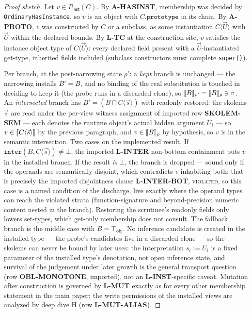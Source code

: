 \documentclass[11pt]{article}
\begin{document}
\begin{proof}[Proof sketch]
Let $v \in P_{\mathsf{inst}}(C)$. By \textbf{A-HASINST}, membership was
decided by \texttt{OrdinaryHasInstance}, so $v$ is an object with
$C.\texttt{prototype}$ in its chain. By \textbf{A-PROTO}, $v$ was
constructed by $C$ or a subclass, as some instantiation
$C\langle \vec U \rangle$ with $\vec U$ within the declared bounds. By
\textbf{L-TC} at the construction site, $v$ satisfies the instance
object type of $C\langle \vec U \rangle$: every declared field present
with a $\vec U$-instantiated get-type, inherited fields included
(subclass constructors must complete \texttt{super()}).

Per branch, at the post-narrowing state $\rho'$: a \emph{kept} branch
is unchanged — the narrowing installs $B' = B$, and no binding of the
real substitution is touched in deciding to keep it (the probe runs in
a discarded clone), so $\llbracket B \rrbracket_{\rho'} = \llbracket B \rrbracket_{\rho} \ni v$. An
\emph{intersected} branch has
$B' = (B \sqcap C\langle \vec s \rangle)$ with readonly restored: the
skolems $\vec s$ are read under the per-view witness assignment of
imported row \textbf{SKOLEM-SEM} — each denotes the runtime object's
actual hidden argument $U_i$ — so
$v \in \llbracket C\langle \vec s \rangle \rrbracket$ by the previous paragraph, and
$v \in \llbracket B \rrbracket_{\rho}$ by hypothesis, so $v$ is in the semantic
intersection. Two cases on the implemented result. If
$\mathtt{inter}(B, C\langle \vec s \rangle) \neq \bot$, the imported
\textbf{L-INTER} non-bottom containment puts $v$ in the installed
branch. If the result \emph{is} $\bot$, the branch is dropped — sound
only if the operands are semantically disjoint, which contradicts
$v$ inhabiting both; that is precisely the imported disjointness
clause \textbf{L-INTER-BOT}, \textsc{violated}, so this case is a
named condition of the discharge, live exactly where the operand
types can reach the violated strata (function-signature and
beyond-precision numeric content nested in the branch).
Restoring the scrutinee's readonly fields only lowers set-types, which
get-only membership does not consult. The fallback branch is the middle
case with $B = \top_{\mathsf{obj}}$. No inference candidate is created
in the installed type — the probe's candidates live in a discarded
clone — so the skolems can never be bound by later uses: the
interpretation $s_i := U_i$ is a fixed parameter of the installed
type's denotation, not open inference state, and survival of the
judgement under later growth is the general transport question
(row \textbf{OBL-MONOTONE}, imported), not an \textbf{L-INST}-specific
caveat. Mutation after construction is governed by \textbf{L-MUT}
exactly as for every other membership statement in the main paper; the
write permissions of the installed views are analyzed by deep dive H (row
\textbf{L-MUT-ALIAS}).
\end{proof}
\end{document}
